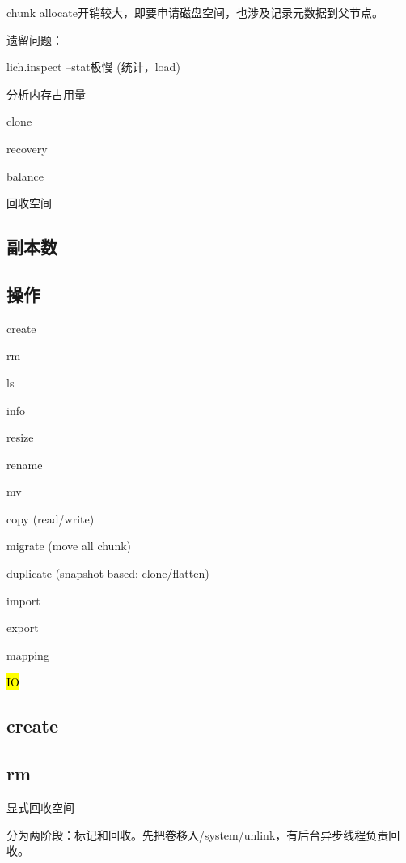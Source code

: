 chunk allocate开销较大，即要申请磁盘空间，也涉及记录元数据到父节点。

遗留问题：
\begin{enumbox}
\item lich.inspect --stat极慢 (统计，load)
\item 分析内存占用量
\item clone
\item recovery
\item balance
\item 回收空间
\end{enumbox}

\subsection{副本数}

\subsection{操作}

\begin{enumbox}
\item create
\item rm
\item ls
\item info
\item resize
\item rename
\item mv
\item copy (read/write)
\item migrate (move all chunk)
\item duplicate (snapshot-based: clone/flatten)
\item import
\item export
\item mapping
\item \hl{IO}
\end{enumbox}

\subsection{create}

\subsection{rm}

显式回收空间

分为两阶段：标记和回收。先把卷移入/system/unlink，有后台异步线程负责回收。

